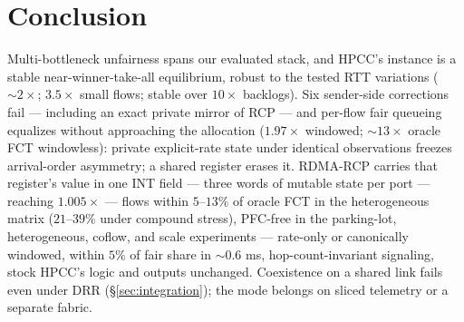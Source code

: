 \documentclass[conference]{IEEEtran}
\newcommand{\hpccfs}{\textsc{RDMA-RCP}\xspace}
\begin{document}
\section{Conclusion}

Multi-bottleneck unfairness spans our evaluated stack, and HPCC's
instance is a stable near-winner-take-all equilibrium, robust to the tested RTT variations
(${\sim}2\times$;
$3.5\times$ small flows; stable over $10\times$ backlogs). Six sender-side
corrections fail --- including an exact private mirror of RCP --- and per-flow fair queueing
equalizes without approaching the allocation ($1.97\times$ windowed; ${\sim}13\times$
oracle FCT windowless): private explicit-rate state under identical observations freezes
arrival-order asymmetry; a shared register erases it. \hpccfs carries that
register's value in one INT field --- three words of mutable state per port --- reaching
$1.005\times$ --- flows within $5$--$13\%$ of oracle FCT in the heterogeneous matrix
($21$--$39\%$ under compound stress), PFC-free in the parking-lot, heterogeneous, coflow, and
scale experiments --- rate-only or canonically windowed, within $5\%$ of fair share in ${\sim}0.6$ ms,
hop-count-invariant signaling, stock HPCC's logic and outputs unchanged.
Coexistence on a shared link fails even under DRR (\S\ref{sec:integration}); the mode
belongs on sliced telemetry or a separate fabric.



\end{document}
